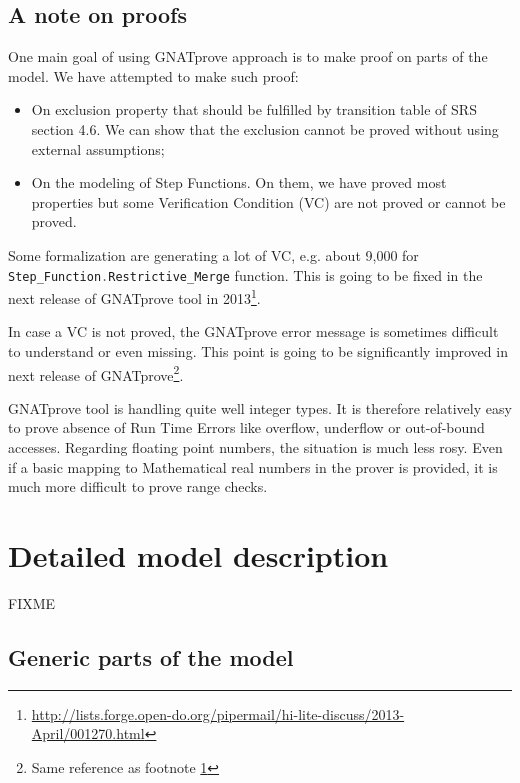 \documentclass{template/openetcs_report}
\newcommand{\Ada}[1]{\lstinline[language=Ada,basicstyle={\sffamily},framesep=0pt]{#1}}
\begin{document}
\section{A note on proofs}

One main goal of using GNATprove approach is to make proof on parts of
the model. We have attempted to make such proof:
\begin{itemize}
\item On exclusion property that should be fulfilled by transition
  table of SRS section 4.6. We can show that the exclusion cannot be
  proved without using external assumptions;
\item On the modeling of Step Functions. On them, we have proved most
  properties but some Verification Condition (VC) are not proved or
  cannot be proved.
\end{itemize}

Some formalization are generating a lot of VC, e.g. about 9,000 for
\Ada{Step_Function.Restrictive_Merge} function. This is going to be
fixed in the next release of GNATprove tool in
2013\footnote{\label{fn:gnatprove-improvements}\url{http://lists.forge.open-do.org/pipermail/hi-lite-discuss/2013-April/001270.html}}.

In case a VC is not proved, the GNATprove error message is sometimes
difficult to understand or even missing. This point is going to be
significantly improved in next release of GNATprove\footnote{Same
  reference as footnote \ref{fn:gnatprove-improvements}}.

GNATprove tool is handling quite well integer types. It is therefore
relatively easy to prove absence of Run Time Errors like overflow,
underflow or out-of-bound accesses. Regarding floating point numbers,
the situation is much less rosy. Even if a basic mapping to
Mathematical real numbers in the prover is provided, it is much more
difficult to prove range checks.

\chapter{Detailed model description}

FIXME

\section{Generic parts of the model}




\end{document}
